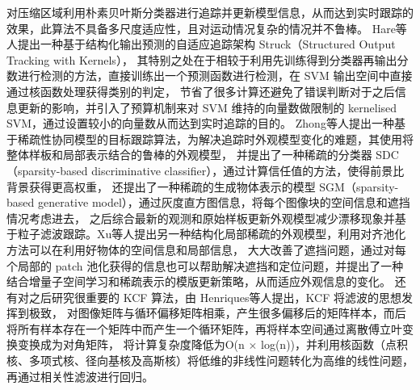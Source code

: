 对压缩区域利用朴素贝叶斯分类器进行追踪并更新模型信息，从而达到实时跟踪的效果，此算法不具备多尺度适应性，且对运动情况复杂的情况并不鲁棒。 
Hare等人\cite{69}提出一种基于结构化输出预测的自适应追踪架构 Struck（Structured Output Tracking with Kernels），
其特别之处在于相较于利用先训练得到分类器再输出分数进行检测的方法，直接训练出一个预测函数进行检测，在 SVM 输出空间中直接通过核函数处理获得类别的判定，
节省了很多计算还避免了错误判断对于之后信息更新的影响，并引入了预算机制来对 SVM 维持的向量数做限制的 kernelised SVM，通过设置较小的向量数从而达到实时追踪的目的。
Zhong等人\cite{70}提出一种基于稀疏性协同模型的目标跟踪算法，为解决追踪时外观模型变化的难题，其使用将整体样板和局部表示结合的鲁棒的外观模型，
并提出了一种稀疏的分类器 SDC（sparsity-based discriminative classifier），通过计算信任值的方法，使得前景比背景获得更高权重，
还提出了一种稀疏的生成物体表示的模型 SGM（sparsity-based generative model），通过灰度直方图信息，将每个图像块的空间信息和遮挡情况考虑进去，
之后综合最新的观测和原始样板更新外观模型减少漂移现象并基于粒子滤波跟踪。Xu等人\cite{71}提出另一种结构化局部稀疏的外观模型，利用对齐池化方法可以在利用好物体的空间信息和局部信息，
大大改善了遮挡问题，通过对每个局部的 patch 池化获得的信息也可以帮助解决遮挡和定位问题，并提出了一种结合增量子空间学习和稀疏表示的模版更新策略，从而适应外观信息的变化。
还有对之后研究很重要的 KCF 算法，由 Henriques等人\cite{72}提出，KCF 将滤波的思想发挥到极致，
对图像矩阵与循环偏移矩阵相乘，产生很多偏移后的矩阵样本，而后将所有样本存在一个矩阵中而产生一个循环矩阵，再将样本空间通过离散傅立叶变换变换成为对角矩阵，
将计算复杂度降低为O(n $\times$ log(n))，并利用核函数（点积核、多项式核、径向基核及高斯核）将低维的非线性问题转化为高维的线性问题，再通过相关性滤波进行回归。

